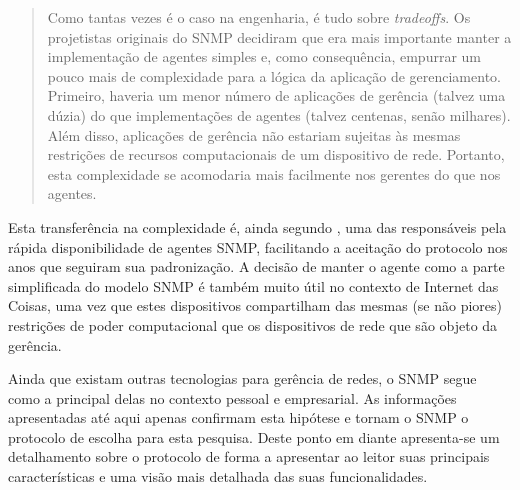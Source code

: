 \documentclass[twoside,english,brazilian]{UNISINOSmonografia}
\begin{document}
\begin{quote}
Como tantas vezes é o caso na engenharia, é tudo sobre \textit{tradeoffs}.
Os projetistas originais do SNMP decidiram que era mais importante manter a 
implementação de agentes simples e, como consequência, empurrar um pouco mais 
de complexidade para a lógica da aplicação de gerenciamento.
Primeiro, haveria um menor número de aplicações de gerência (talvez uma dúzia) 
do que implementações de agentes (talvez centenas, senão milhares).
Além disso, aplicações de gerência não estariam sujeitas às mesmas restrições 
de recursos computacionais de um dispositivo de rede.
Portanto, esta complexidade se acomodaria mais facilmente nos gerentes do que 
nos agentes.
\cite[p.~250]{Clemm2006}
\end{quote}

Esta transferência na complexidade é, ainda segundo , uma 
das responsáveis pela rápida disponibilidade de agentes SNMP, facilitando a 
aceitação do protocolo nos anos que seguiram sua padronização.
A decisão de manter o agente como a parte simplificada do modelo SNMP é também 
muito útil no contexto de Internet das Coisas, uma vez que estes dispositivos 
compartilham das mesmas (se não piores) restrições de poder computacional que 
os dispositivos de rede que são objeto da gerência.


Ainda que existam outras tecnologias para gerência de redes, o SNMP segue 
como a principal delas no contexto pessoal e empresarial.
As informações apresentadas até aqui apenas confirmam esta hipótese
e tornam o SNMP o protocolo de escolha para esta pesquisa.
Deste ponto em diante apresenta-se um detalhamento sobre o protocolo de forma
a apresentar ao leitor suas principais características e uma visão mais 
detalhada das suas funcionalidades.
\end{document}
